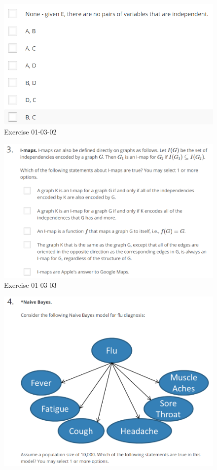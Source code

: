 \documentclass[12pt]{article}
\numberwithin{equation}{section}
\begin{document}
\begin{figure}[H]
	\includegraphics[width=\linewidth]{PGMpics/01-03-02-2.png}
	\caption{Exercise 01-03-02}
	\label{fig:01-03-02-2}
\end{figure}
\begin{figure}[H]
	\includegraphics[width=\linewidth]{PGMpics/01-03-03.png}
	\caption{Exercise 01-03-03}
	\label{fig:01-03-03}
\end{figure}
\begin{figure}[H]
	\includegraphics[width=\linewidth]{PGMpics/01-03-04-1.png}
	\label{fig:01-03-04-1}
\end{figure}
\end{document}

